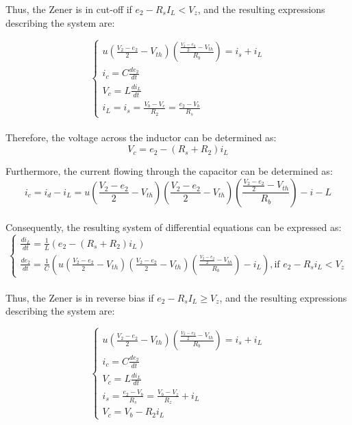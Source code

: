 Thus, the Zener is in cut-off if $e_2 - R_sI_L < V_z$, and the resulting expressions describing the system are:

\begin{equation}
    \begin{cases}
        u(\frac{V_2-e_2}{2}-V_{th})(\frac{\frac{V_2-e_2}{2}-V_{th}}{R_b})=i_s+i_L\\
        i_c=C\frac{de_2}{dt}\\
        V_c=L\frac{di_L}{dt}\\
        i_L=i_s=\frac{V_b-V_c}{R_2}=\frac{e_2-V_b}{R_s}
    \end{cases}
\end{equation}\\

Therefore, the voltage across the inductor can be determined as:\\

\begin{equation}
    V_c=e_2-(R_s+R_2)i_L
\end{equation}

Furthermore, the current flowing through the capacitor can be determined as:\\

\begin{equation}
    i_c=i_d-i_L=u(\frac{V_2-e_2}{2}-V_{th})(\frac{V_2-e_2}{2}-V_{th})(\frac{\frac{V_2-e_2}{2}-V_{th}}{R_b})-i-L
\end{equation}\\

Consequently, the resulting system of differential equations can be expressed as:\\

\begin{equation}
    \begin{cases}
        \frac{di_L}{dt}=\frac{1}{L}(e_2-(R_s+R_2)i_L)\\
        \frac{de_2}{dt}=\frac{1}{C}\left(u\left(\frac{V_2-e_2}{2}-V_{th}\right)\left(\frac{V_2-e_2}{2}-V_{th}\right)\left(\frac{\frac{V_2-e_2}{2}-V_{th}}{R_b}\right)-i_L\right), \text{if } e_2-R_si_L<V_z
    \end{cases}
\end{equation}\\

Thus, the Zener is in reverse bias if $e_2 - R_sI_L \geq V_z$, and the resulting expressions describing the system are:

\begin{equation}
    \begin{cases}
        u(\frac{V_2-e_2}{2}-V_{th})(\frac{\frac{V_2-e_2}{2}-V_{th}}{R_b})=i_s+i_L\\
        i_c=C\frac{de_2}{dt}\\
        V_c=L\frac{di_L}{dt}\\
        i_s=\frac{e_2-V_b}{R_s}=\frac{V_b-V_z}{R_z}+i_L\\
        V_c=V_b-R_2i_L
    \end{cases}
\end{equation}\\

